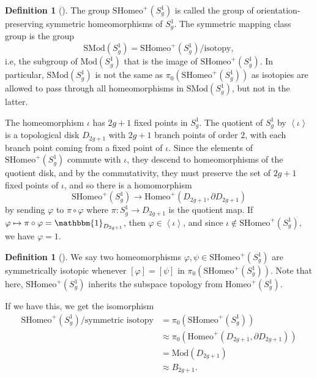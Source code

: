 \documentclass[reqno]{amsart}
\theoremstyle{definition}
\newtheorem{definition}[theorem]{Definition}
\theoremstyle{remark}
\newcommand{\Mod}{{\mathrm{Mod}}}
\newcommand{\SMod}{{\mathrm{SMod}}}
\newcommand{\Homeo}{{\mathrm{Homeo}}}
\newcommand{\SHomeo}{{\mathrm{SHomeo}}}
\begin{document}
 \begin{definition}[]
 The group $\SHomeo^{+} \left( S_g^{1} \right) $ is
 called the group of orientation-preserving
 symmetric homeomorphisms of $S_g^{1}$. 
 The symmetric mapping class group is the group
 \[
 \SMod (S_g^{1}) = 
 \SHomeo^{+} \left( S_g^{1} \right) / \text{isotopy},
 \] 
 i.e, the subgroup of $\Mod \left( S_g^{1} \right) $ that
 is the image of $\SHomeo^{+} \left( S_g^{1} \right) $.
 In particular,
 $\SMod \left( S_g^{1} \right) $ is not the same
 as
 $\pi_0 \left( \SHomeo^{+} 
 \left( S_g^{1} \right) \right) $ as isotopies are
 allowed to pass through all homeomorphisms 
 in $\SMod \left( S_g^{1} \right) $, but not
 in the latter.
 \end{definition}

 The homeomorphism $\iota$ has
  $2g+1$ fixed points in
   $S_g^{1}$. The quotient of
   $S_g^{1}$ by $\left<\iota \right>$ is
   a topological disk
   $D_{2g+1}$ with $2g+1$ branch points of order
   $2$, with each branch point coming from a fixed point of $\iota$.
   Since the elements of  $\SHomeo^{+} \left( S_g^{1} \right) $ 
   commute with $\iota$, they descend to homeomorphisms
   of the quotient disk, and by the commutativity, they
   must preserve the set of  $2g+1$ fixed points of $\iota$,
   and so there is a homomorphism
    \[
   \SHomeo^{+} \left( S_g^{1} \right) 
   \to \Homeo^{+} \left( D_{2g+1}, \partial D_{2g+1} \right) 
   \] 
   by sending
   $\varphi $ to
   $\pi \circ \varphi $ where
   $\pi \colon S_g^{1} \to 
   D_{2g+1}$ is the quotient map. If
   $\varphi  \mapsto \pi \circ \varphi  = \mathbbm{1}_{
   D_{2g+1}}$, then $\varphi  
   \in \left<\iota \right>$, and since $\iota 
   \not\in \SHomeo^{+} \left( S_g^{1} \right) $, we have
   $\varphi  = 1$.
   



   \begin{definition}[]
       We say two homeomorphisms
       $\varphi , \psi \in \SHomeo^{+}\left( S_g^{1} \right) $ 
       are symmetrically isotopic whenever
       $\left[ \varphi  \right] =
       \left[ \psi \right] $ in
       $\pi_0 \left( \SHomeo^{+}\left( S_g^{1} \right)  \right) $.
       Note that here,
       $\SHomeo^{+} \left( S_g^{1} \right) $ inherits
       the subspace topology from
       $\Homeo^{+} \left( S_{g}^{1} \right) $.
   \end{definition}

   If we have this, we get the isomorphism
   \begin{align*}
       \SHomeo^{+} \left( S_g^{1} \right) /
       \text{symmetric isotopy}
       &= \pi_0 \left( \SHomeo^{+}(S_g^{1}) \right) \\
       &\approx \pi_0 \left( \Homeo^{+} \left( 
       D_{2g+1}, \partial D_{2g+1} \right)  \right) \\
       &= \Mod \left( D_{2g+1} \right) \\
       &\approx B_{2g+1}.
   \end{align*}
   
\end{document}
